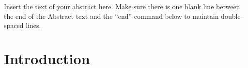 \documentclass[12pt,letterpaper]{lsuetd}
\begin{document}
\renewcommand\@pnumwidth{1.55em}
\renewcommand\@tocrmarg{8.55em}
\listoftables
\pagebreak
\listoffigures
\pagebreak


\renewenvironment{abstract}{{\hspace{-2.2em} \huge \textbf{\abstractname}} \par}{\pagebreak}
\begin{abstract}
\vspace{0.55ex}
\doublespacing
Insert the text of your abstract here.  Make sure there is one blank line between the end of the Abstract text and the ``end'' command below to maintain double--spaced lines.

\end{abstract}

\singlespacing
\setlength{\textfloatsep}{12pt plus 2pt minus 2pt}
\setlength{\intextsep}{6pt plus 2pt minus 2pt}
\chapter{Introduction}
\doublespacing

\pagebreak
\singlespacing
\end{document}
